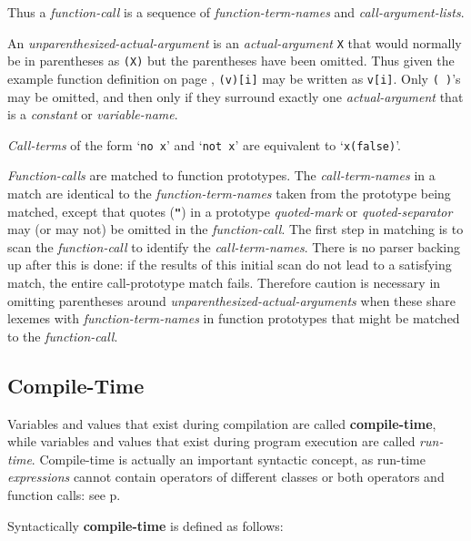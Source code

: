 \documentclass[12pt]{article}
\newcommand{\TT}[1]{{\tt \bfseries #1}}
\newcommand{\key}[1]{{\rm \bfseries #1}}
\newcommand{\pagref}[1]{p\pageref{#1}}
\begin{document}
Thus a {\em function-call} is a sequence of {\em function-term-names}
and {\em call-argument-lists}.

An {\em unparenthesized-actual-argument} is an {\em actual-argument}
{\tt X} that would normally be in parentheses as {\tt (X)} but the
parentheses have been omitted.  Thus given the example function definition
on page \pageref{REFERENCE-EXPRESSION-FUNCTION-EXAMPLE},
{\tt (v)[i]} may be written as {\tt v[i]}.  Only {\tt (~)}'s may be
omitted, and then only if they surround exactly one {\em actual-argument}
that is a {\em constant} or {\em variable-name}.

{\em Call-terms} of the form `{\tt no x}' and `{\tt not x}' are
equivalent to `{\tt x(false)}'.

{\em Function-calls} are matched to function prototypes.  The
{\em call-term-names} in a match are identical to the
{\em function-term-names} taken from the prototype being matched, except
that quotes (\TT{"}) in a prototype {\em quoted-mark} or
{\em quoted-separator} may (or may not) be omitted in the
{\em function-call}.  The first
step in matching is to scan the {\em function-call} to identify the
{\em call-term-names}.  There is no parser backing up after this is
done: if the results of this initial scan do not lead to a satisfying
match, the entire call-prototype match fails.  Therefore caution
is necessary in omitting parentheses around
{\em unparenthesized-actual-arguments} when these share lexemes with
{\em function-term-names} in function prototypes that might be
matched to the {\em function-call}.

\subsection{Compile-Time}
\label{COMPILE-TIME}

Variables and values that exist during compilation are called
\key{compile-time}, while variables and values that exist during
program execution are called {\em run-time}.  Compile-time
is actually an important syntactic concept, as run-time
{\em expressions} cannot contain operators of different
classes or both operators and function calls: see
\pagref{RUN-TIME-EXPRESSION-LIMITS}.

Syntactically \key{compile-time} is defined as follows:
\end{document}
